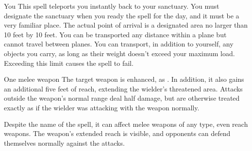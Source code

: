 \begin{spellheader}
\end{spellheader}
\begin{spelleffects}
    \begin{spelltarget}{You}
        \spelleffect This spell teleports you instantly back to your sanctuary. You must designate the sanctuary when you ready the spell for the day, and it must be a very familiar place. The actual point of arrival is a designated area no larger than 10 feet by 10 feet. You can be transported any distance within a plane but cannot travel between planes. You can transport, in addition to yourself, any objects you carry, as long as their weight doesn't exceed your maximum load. Exceeding this limit causes the spell to fail.
    \end{spelltarget}
\end{spelleffects}
\begin{spellfooter}
    
\end{spellfooter}

\begin{spellheader}
    \spelldur{\durshort}
\end{spellheader}
\begin{spelleffects}
    \begin{spelltarget}{One melee weapon}
        \spelleffect The target weapon is enhanced, as . In addition, it also gains an additional five feet of reach, extending the wielder's threatened area. Attacks outside the weapon's normal range deal half damage, but are otherwise treated exactly as if the wielder was attacking with the weapon normally.
    \end{spelltarget}
\end{spelleffects}
\begin{spellfooter}
    \spellnotes Despite the name of the spell, it can affect melee weapons of any type, even reach weapons. The weapon's extended reach is visible, and opponents can defend themselves normally against the attacks.
\end{spellfooter}

